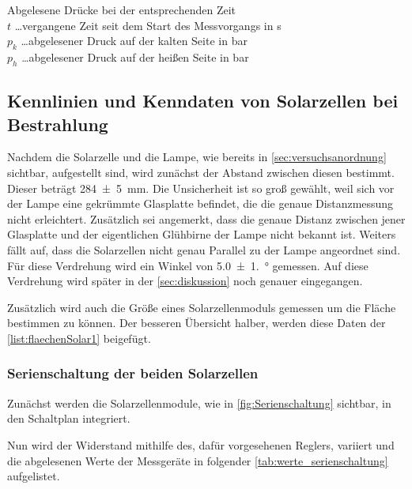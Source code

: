\documentclass[12pt,english,ngerman]{scrartcl}
\begin{document}
\begin{table}[H]
	\caption[Abgelesene Drücke bei der entsprechenden Zeit]{
		Abgelesene Drücke bei der entsprechenden Zeit\\
		$t$ \dots vergangene Zeit seit dem Start des Messvorgangs in s\\
		$p_k$ \dots abgelesener Druck auf der kalten Seite in bar\\
		$p_h$ \dots abgelesener Druck auf der heißen Seite in bar\\}
	\centering
	
	\label{tab:drucke}
\end{table}

\subsection{Kennlinien und Kenndaten von Solarzellen bei Bestrahlung}

Nachdem die Solarzelle und die Lampe, wie bereits in
\autoref{sec:versuchsanordnung} sichtbar, aufgestellt sind, wird zunächst der
Abstand zwischen diesen bestimmt. Dieser beträgt \SI{284(5)}{\mm}. Die
Unsicherheit ist so groß gewählt, weil sich vor der Lampe eine gekrümmte
Glasplatte befindet, die die genaue Distanzmessung nicht erleichtert.
Zusätzlich sei angemerkt, dass die genaue Distanz zwischen jener Glasplatte und
der eigentlichen Glühbirne der Lampe nicht bekannt ist. Weiters fällt auf, dass
die Solarzellen nicht genau Parallel zu der Lampe angeordnet sind. Für diese
Verdrehung wird ein Winkel von \SI{5.0(1.0)}{\degree} gemessen. Auf diese
Verdrehung wird später in der \autoref{sec:diskussion} noch genauer
eingegangen.

Zusätzlich wird auch die Größe eines Solarzellenmoduls gemessen um die Fläche
bestimmen zu können. Der besseren Übersicht halber, werden diese Daten der
\cref{list:flaechenSolar1} beigefügt.

\subsubsection{Serienschaltung der beiden Solarzellen}

Zunächst werden die Solarzellenmodule, wie in \autoref{fig:Serienschaltung}
sichtbar, in den Schaltplan integriert.

Nun wird der Widerstand mithilfe des, dafür vorgesehenen Reglers, variiert und
die abgelesenen Werte der Messgeräte in folgender
\autoref{tab:werte_serienschaltung} aufgelistet.
\end{document}
